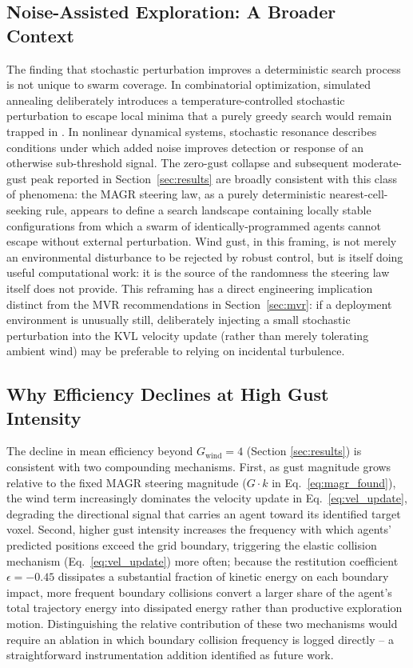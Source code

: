 \documentclass[10pt,journal]{IEEEtran}
\begin{document}
\subsection{Noise-Assisted Exploration: A Broader Context}
The finding that stochastic perturbation improves a deterministic search
process is not unique to swarm coverage. In combinatorial optimization,
simulated annealing deliberately introduces a temperature-controlled
stochastic perturbation to escape local minima that a purely greedy search
would remain trapped in \cite{kirkpatrick1983}. In nonlinear dynamical
systems, stochastic resonance describes conditions under which added noise
improves detection or response of an otherwise sub-threshold signal. The
zero-gust collapse and subsequent moderate-gust peak reported in
Section~\ref{sec:results} are broadly consistent with this class of
phenomena: the MAGR steering law, as a purely deterministic
nearest-cell-seeking rule, appears to define a search landscape containing
locally stable configurations from which a swarm of identically-programmed
agents cannot escape without external perturbation. Wind gust, in this
framing, is not merely an environmental disturbance to be rejected by
robust control, but is itself doing useful computational work: it is the
source of the randomness the steering law itself does not provide. This
reframing has a direct engineering implication distinct from the MVR
recommendations in Section~\ref{sec:mvr}: if a deployment environment is
unusually still, deliberately injecting a small stochastic perturbation
into the KVL velocity update (rather than merely tolerating ambient wind)
may be preferable to relying on incidental turbulence.

\subsection{Why Efficiency Declines at High Gust Intensity}
The decline in mean efficiency beyond $G_{\text{wind}}=4$ (Section
\ref{sec:results}) is consistent with two compounding mechanisms. First, as
gust magnitude grows relative to the fixed MAGR steering magnitude ($G
\cdot k$ in Eq.~\ref{eq:magr_found}), the wind term increasingly dominates
the velocity update in Eq.~\ref{eq:vel_update}, degrading the directional
signal that carries an agent toward its identified target voxel. Second,
higher gust intensity increases the frequency with which agents' predicted
positions exceed the grid boundary, triggering the elastic collision
mechanism (Eq.~\ref{eq:vel_update}) more often; because the restitution
coefficient $\epsilon=-0.45$ dissipates a substantial fraction of kinetic
energy on each boundary impact, more frequent boundary collisions convert
a larger share of the agent's total trajectory energy into dissipated
energy rather than productive exploration motion. Distinguishing the
relative contribution of these two mechanisms would require an ablation
in which boundary collision frequency is logged directly -- a
straightforward instrumentation addition identified as future work.
\end{document}
